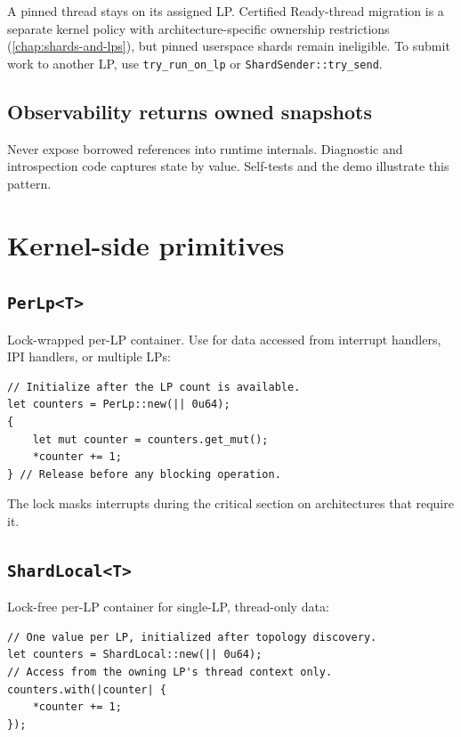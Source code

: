 A pinned thread stays on its assigned LP. Certified Ready-thread migration is
a separate kernel policy with architecture-specific ownership restrictions
(\autoref{chap:shards-and-lps}), but pinned userspace shards remain ineligible.
To submit work to another LP, use
\texttt{try\_run\_on\_lp} or \texttt{ShardSender::try\_send}.

\subsection{Observability returns owned snapshots}

Never expose borrowed references into runtime internals. Diagnostic and
introspection code captures state by value. Self-tests and the demo illustrate
this pattern.

\section{Kernel-side primitives}

\subsection{\texttt{PerLp<T>}}

Lock-wrapped per-LP container. Use for data accessed from interrupt handlers,
IPI handlers, or multiple LPs:

\begin{lstlisting}[style=rustCode]
// Initialize after the LP count is available.
let counters = PerLp::new(|| 0u64);
{
    let mut counter = counters.get_mut();
    *counter += 1;
} // Release before any blocking operation.
\end{lstlisting}

The lock masks interrupts during the critical section on architectures that
require it.

\subsection{\texttt{ShardLocal<T>}}

Lock-free per-LP container for single-LP, thread-only data:

\begin{lstlisting}[style=rustCode]
// One value per LP, initialized after topology discovery.
let counters = ShardLocal::new(|| 0u64);
// Access from the owning LP's thread context only.
counters.with(|counter| {
    *counter += 1;
});
\end{lstlisting}

